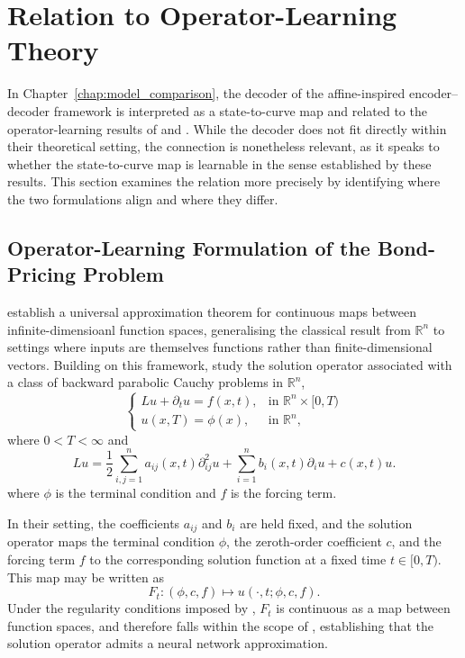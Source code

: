 \section{Relation to Operator-Learning Theory}
\label{app:operator_learning_relation}


In Chapter~\ref{chap:model_comparison}, the decoder of the affine-inspired encoder--decoder framework is interpreted as a state-to-curve map and related to the operator-learning results of \citet{Benth2023} and \citet{Benth2024}. While the decoder does not fit directly within their theoretical setting, the connection is nonetheless relevant, as it speaks to whether the state-to-curve map is learnable in the sense established by these results. This section examines the relation more precisely by identifying where the two formulations align and where they differ.


\subsection{Operator-Learning Formulation of the Bond-Pricing Problem}


\citet{Benth2023} establish a universal approximation theorem for continuous maps between infinite-dimensioanl function spaces, generalising the classical result from $\mathbb{R}^n$ to settings where inputs are themselves functions rather than finite-dimensional vectors. Building on this framework, \citet{Benth2024} study the solution operator associated with a class of backward parabolic Cauchy problems in $\mathbb{R}^n$,
\begin{equation}
    \begin{cases}
        Lu + \partial_t u = f(x,t), & \text{in } \mathbb{R}^n \times [0,T) \\
        u(x,T) = \phi(x), & \text{in } \mathbb{R}^n,
    \end{cases}
\end{equation}
where $0 < T < \infty$ and
\begin{equation}
    Lu = \frac{1}{2} \sum_{i,j=1}^{n} a_{ij}(x,t)\partial^2_{ij} u 
       + \sum_{i=1}^{n} b_i(x,t)\partial_i u + c(x,t)u.
\end{equation}
where $\phi$ is the terminal condition and $f$ is the forcing term.

In their setting, the coefficients $a_{ij}$ and $b_i$ are held fixed, and the solution operator maps the terminal condition $\phi$, the zeroth-order coefficient $c$, and the forcing term $f$ to the corresponding solution function at a fixed time $t\in[0,T)$. This map may be written as 
\[
F_t:
(\phi,c,f)
\longmapsto
u(\cdot,t;\phi,c,f).
\]
Under the regularity conditions imposed by \citet{Benth2024}, $F_t$ is continuous as a map between function spaces, and therefore falls within the scope of \citet{Benth2023}, establishing that the solution operator admits a neural network approximation.

